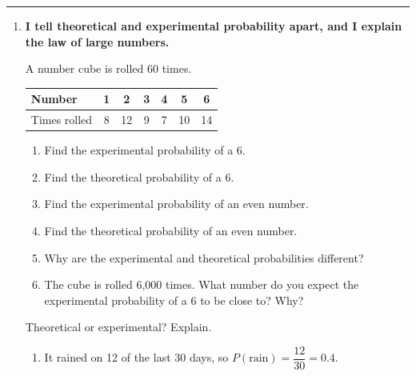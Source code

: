\documentclass[11pt]{article}
\newcommand{\lessonhead}[1]{\par\vspace{0.6em}{\large\bfseries #1}\par\vspace{0.25em}\hrule\vspace{0.6em}}
\newcommand{\goal}[1]{\textbf{#1}\par\vspace{0.35em}}
\begin{document}
\newpage
\lessonhead{6.4 - Simulations}
\begin{enumerate}[resume]

\item \goal{I tell theoretical and experimental probability apart, and I explain the law of large numbers.}
A number cube is rolled 60 times.
\begin{center}
\renewcommand{\arraystretch}{1.4}
\begin{tabular}{|l|c|c|c|c|c|c|}\hline
Number & 1 & 2 & 3 & 4 & 5 & 6 \\ \hline
Times rolled & 8 & 12 & 9 & 7 & 10 & 14 \\ \hline
\end{tabular}
\end{center}
\begin{enumerate}
  \item Find the experimental probability of a 6. 
  \work{2.5em}
  \item Find the theoretical probability of a 6. 
  \work{2.5em}
  \item Find the experimental probability of an even number. 
  \work{2.5em}
  \item Find the theoretical probability of an even number. 
  \work{2.5em}
  \item Why are the experimental and theoretical probabilities different?

  \work{3em}
  \item The cube is rolled 6,000 times. What number do you expect the experimental probability of a 6 to be close to? Why?

  \work{3em}
\end{enumerate}

\vspace{0.4em}
Theoretical or experimental? Explain.
\begin{enumerate}[start=7]
  \item It rained on 12 of the last 30 days, so $P(\text{rain}) = \dfrac{12}{30} = 0.4$.


\end{enumerate}
\end{enumerate}
\end{document}
